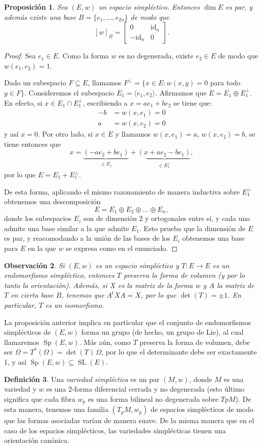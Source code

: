 \documentclass[11pt, a4paper]{article}
\newcommand{\id}{\mathrm{id}}
\DeclareMathOperator{\Sp}{Sp}
\DeclareMathOperator{\SL}{SL}
\theoremstyle{plain}
\newtheorem{prop}{Proposición}[section]
\newtheorem{obs}[prop]{Observación}
\theoremstyle{definition}
\newtheorem{defn}[prop]{Definición}
\begin{document}
\begin{prop} Sea $(E,w)$ un espacio simpléctico. Entonces $\dim E$ es par, y además existe una base $B=\{e_1,\dots,e_{2n}\}$ de modo que
\[[w]_B=\begin{bmatrix}
    0 &\id_n\\
    -\id_n & 0
\end{bmatrix}.\]
\end{prop}
\begin{proof} Sea $e_1\in E$. Como la forma $w$ es no degenerada, existe $e_2\in E$ de modo que $w(e_1,e_2)=1$.

Dado un subespacio $F\subseteq E$, llamamos $F^\perp = \{x\in E : w(x,y)=0$ para todo $y\in F\}$. Consideremos el subespacio $E_1 = \langle e_1, e_2\rangle$. Afirmamos que $E = E_1\oplus E_1^\perp$. En efecto, si $x\in E_1\cap E_1^\perp$, escribiendo a $x=a e_1 + b e_2$ se tiene que:
\begin{align*}
-b&=w(x,e_1)=0\\
a&=w(x,e_2) =0
\end{align*}
y así $x=0$. Por otro lado, si $x\in E$ y llamamos $w(x,e_1)=a$, $w(x,e_2)=b$, se tiene entonces que
\[ x = \underbrace{(-ae_2 + be_1)}_{\substack{\in E_1}} + \underbrace{(x+ae_2-be_1)}_{\substack{\in E_1^\perp}},\]
por lo que $E=E_1+E_1^\perp$.

De esta forma, aplicando el mismo razonamiento de manera inductiva sobre $E_1^\perp$ obtenemos una descomposición
\[E=E_1\oplus E_2 \oplus\dots\oplus E_n,\]
donde los subespacios $E_i$ son de dimensión 2 y ortogonales entre sí, y cada uno admite una base similar a la que admite $E_1$. Esto prueba que la dimensión de $E$ es par, y reacomodando a la unión de las bases de los $E_i$ obtenemos una base para $E$ en la que $w$ se expresa como en el enunciado.
\end{proof}
\begin{obs} Si $(E,w)$ es un espacio simpléctico y $T:E\to E$ es un endomorfismo simpléctico, entonces $T$ preserva la forma de volumen (y por lo tanto la orientación). Además, si $X$ es la matriz de la forma $w$ y $A$ la matriz de $T$ en cierta base $B$, tenemos que $A^tXA=X$, por lo que $\det(T)=\pm 1$. En particular, $T$ es un isomorfismo.
\end{obs}
La proposición anterior implica en particular que el conjunto de endomorfismos simplécticos de $(E,w)$ forma un grupo (de hecho, un grupo de Lie), al cual llamaremos $\Sp(E,w)$. Más aún, como $T$ preserva la forma de volumen, debe ser $\Omega=T^*(\Omega) = \det(T)\,\Omega$, por lo que el determinante debe ser exactamente 1, y así $\Sp(E,w)\subseteq \SL(E)$.
\begin{defn} Una \emph{variedad simpléctica} es un par $(M,w)$, donde $M$ es una variedad y $w$ es una 2-forma diferencial cerrada y no degenerada (esto último significa que cada fibra $w_p$ es una forma bilineal no degenerada sobre $TpM$). De esta manera, tenemos una familia $(T_pM, w_p)$ de espacios simplécticos de modo que las formas asociadas varían de manera suave. De la misma manera que en el caso de los espacios simplécticos, las variedades simplécticas tienen una orientación canónica.
\end{defn}
\end{document}
